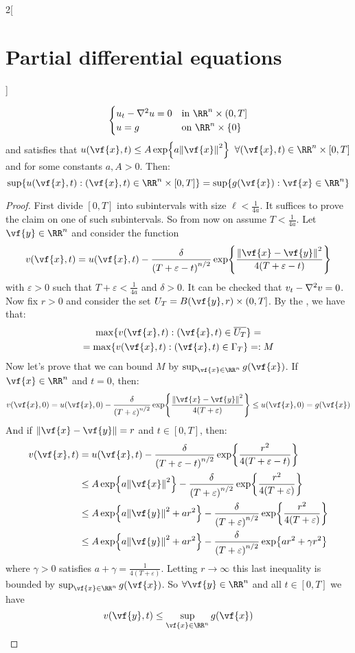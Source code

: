 \documentclass[../../../main_math.tex]{subfiles}
\begin{document}
\begin{multicols}{2}[\section{Partial differential equations}]
\begin{theorem}
    $$
      \begin{cases}
        u_{t}  -\laplacian{u} = 0 & \text{in $\RR^n\times (0,T]$} \\
        u=g                       & \text{on $\RR^n\times \{0\}$}
      \end{cases}
    $$ and satisfies that $u(\vf{x},t)\leq A\exp{a\norm{\vf{x}}^2}$ $\forall (\vf{x},t)\in\RR^n\times [0,T]$ and for some constants $a, A> 0$. Then:
    $$\displaystyle\sup\{u(\vf{x},t):(\vf{x},t)\in\RR^n\times[0,T]\}=\sup\{g(\vf{x}):\vf{x}\in\RR^n\}$$
  \end{theorem}
  \begin{proof}
    First divide $[0,T]$ into subintervals with size $\ell < \frac{1}{4a}$. It suffices to prove the claim on one of such subintervals. So from now on assume $T < \frac{1}{4a}$. Let $\vf{y}\in\RR^n$ and consider the function
    $$v(\vf{x},t)=u(\vf{x},t)-\frac{\delta}{{(T+\varepsilon -t)}^{n/2}}\exp{\frac{\norm{\vf{x}-\vf{y}}^2}{4(T+\varepsilon -t)}}$$
    with $\varepsilon>0$ such that $T+\varepsilon<\frac{1}{4a}$ and $\delta>0$. It can be checked that $v_t- \laplacian v= 0$. Now fix $r>0$ and consider the set $U_T=B(\vf{y}, r)\times(0,T]$. By the , we have that:
    \begin{multline*}
      \max\{v(\vf{x},t):(\vf{x},t)\in\overline{U_T}\}=\\=\max\{v(\vf{x},t):(\vf{x},t)\in\Gamma_T\}=:M
    \end{multline*}
    Now let's prove that we can bound $M$ by $\sup_{\vf{x}\in\RR^n} g(\vf{x})$. If $\vf{x}\in\RR^n$ and $t=0$, then:
    $$v(\vf{x},0)=u(\vf{x},0)-\frac{\delta}{{(T+\varepsilon)}^{n/2}}\exp{\frac{\norm{\vf{x}-\vf{y}}^2}{4(T+\varepsilon)}}\leq u(\vf{x},0) = g(\vf{x})$$
    And if $\norm{\vf{x}-\vf{y}}=r$ and $t\in[0,T]$, then:
    \begin{align*}
      v(\vf{x},t) & =u(\vf{x},t)-\frac{\delta}{{(T+\varepsilon -t)}^{n/2}}\exp{\frac{r^2}{4(T+\varepsilon -t)}}                  \\
                  & \leq A\exp{a\norm{\vf{x}}^2}-\frac{\delta}{{(T+\varepsilon)}^{n/2}}\exp{\frac{r^2}{4(T+\varepsilon)}}        \\
                  & \leq A\exp{a\norm{\vf{y}}^2 + ar^2}-\frac{\delta}{{(T+\varepsilon)}^{n/2}}\exp{\frac{r^2}{4(T+\varepsilon)}} \\
                  & \leq A\exp{a\norm{\vf{y}}^2 + ar^2}-\frac{\delta}{{(T+\varepsilon)}^{n/2}}\exp{ar^2 +\gamma r^2}
    \end{align*}
    where $\gamma>0$ satisfies $a+\gamma=\frac{1}{4(T+\varepsilon)}$. Letting $r\to\infty$ this last inequality is bounded by $\sup_{\vf{x}\in\RR^n} g(\vf{x})$. So $\forall\vf{y}\in\RR^n$ and all $t\in[0,T]$ we have $$v(\vf{y},t)\leq \sup_{\vf{x}\in\RR^n} g(\vf{x})$$

\end{proof}
\end{multicols}
\end{document}
